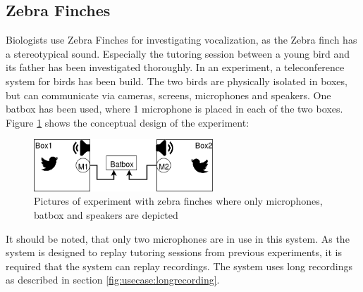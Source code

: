 


\subsection{Zebra Finches}
Biologists use Zebra Finches for investigating vocalization, as the Zebra finch has a stereotypical sound. Especially the tutoring session between a young bird and its father has been investigated thoroughly. In an experiment, a teleconference system for birds has been build. The two birds are physically isolated in boxes,
but can communicate via cameras, screens, microphones and speakers. One batbox has been used, where 1 microphone is placed in each of the two boxes.\citep{larsen2016system}
Figure \ref{fig:usecases:zebra:overview} shows the conceptual design of the experiment:

\begin{figure}[h!]
	\centering
	\includegraphics[width=0.6\textwidth]{figures/zebrafinches_experiment1.png}
	\caption{Pictures of experiment with zebra finches where only microphones, batbox and speakers are depicted}\label{fig:usecases:zebra:overview}
\end{figure}
It should be noted, that only two microphones are in use in this system.
As the system is designed to replay tutoring sessions from previous experiments, it is required that the system can replay recordings.
The system uses long recordings as described in section \ref{fig:usecase:longrecording}.


